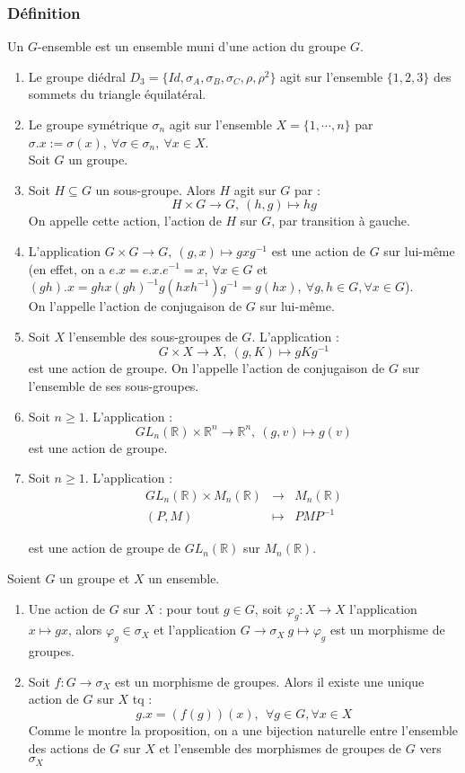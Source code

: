 \documentclass[a4paper, oneside]{report}
\theoremstyle{break}
\newcommand{\x}{\times}
\newcommand{\R}{\mathbb{R}}
\begin{document}
\subsubsection{Définition}
Un $G$-ensemble est un ensemble muni d'une action du groupe $G$.

\exem
\begin{enumerate}
\item Le groupe diédral $D_3=\{Id, \sigma_A, \sigma_B, \sigma_C, \rho, \rho^2\}$ agit sur l'ensemble $\{1,2,3\}$ des sommets du triangle équilatéral.
\item Le groupe symétrique $\sigma_n$ agit sur l'ensemble $X=\{1,\cdots,n\}$ par $\sigma.x := \sigma(x), ~\forall \sigma \in \sigma_n,~\forall x\in X$.\\

Soit $G$ un groupe.
\item Soit $H\subseteq G$ un sous-groupe. Alors $H$ agit sur $G$ par :
$$H\x G \rightarrow G,~ (h,g)\mapsto hg$$
On appelle cette action, l'action de $H$ sur $G$, par transition à gauche.
\item L'application $G\x G \rightarrow G,~ (g,x) \mapsto gxg^{-1}$ est une action de $G$ sur lui-même (en effet, on a $e.x = e.x.e^{-1} =x$, $\forall x\in G$ et $(gh).x=ghx(gh)^{-1}g(hxh^{-1})g^{-1}=g(hx),~\forall g,h\in G, \forall x\in G$).\\
On l'appelle l'action de conjugaison de $G$ sur lui-même.
\item Soit $X$ l'ensemble des sous-groupes de $G$. L'application :
$$G\x X \rightarrow X,~(g,K)\mapsto gKg^{-1}$$
est une action de groupe. On l'appelle l'action de conjugaison de $G$ sur l'ensemble de ses sous-groupes.
\item Soit $n\geq 1$. L'application :
$$GL_n(\R)\x \R^n \rightarrow \R^n,~(g,v)\mapsto g(v)$$
est une action de groupe.
\item Soit $n\geq 1$. L'application :
$$\begin{array}{lll}
GL_n(\R)\x M_n(\R)&\rightarrow & M_n(\R)\\
(P,M)&\mapsto & PMP^{-1}
\end{array}$$

est une action de groupe de $GL_n(\R)$ sur $M_n(\R)$.
\end{enumerate}

\propr
Soient $G$ un groupe et $X$ un ensemble.
\begin{enumerate}
\item Une action de $G$ sur $X$ : pour tout $g\in G$, soit $\varphi_g :X \rightarrow X$ l'application $x\mapsto gx$, alors $\varphi_g \in \sigma_X$ et l'application $G\rightarrow \sigma_X~g\mapsto \varphi_g$ est un morphisme de groupes.
\item Soit $f:G\rightarrow \sigma_X$ est un morphisme de groupes. Alors il existe une unique action de $G$ sur $X$ tq :
$$g.x = (f(g))(x),~~\forall g\in G,\forall x\in X$$
Comme le montre la proposition, on a une bijection naturelle entre l'ensemble des actions de $G$ sur $X$ et l'ensemble des morphismes de groupes de $G$ vers $\sigma_X$
\end{enumerate}
\end{document}
